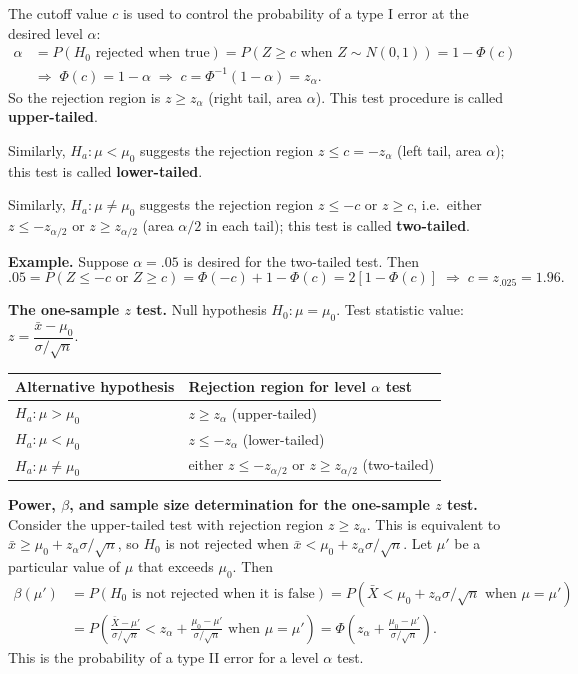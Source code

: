 The cutoff value $c$ is used to control the probability of a type I error at the desired level $\alpha$:
\begin{align*}
\alpha &= P(H_0 \text{ rejected when true}) = P(Z\ge c \text{ when } Z\sim N(0,1)) = 1-\Phi(c)\\
&\Rightarrow\; \Phi(c)=1-\alpha \;\Rightarrow\; c=\Phi^{-1}(1-\alpha)=z_\alpha .
\end{align*}
So the rejection region is $z\ge z_\alpha$ (right tail, area $\alpha$). This test procedure is called \textbf{upper-tailed}.


Similarly, $H_a:\mu<\mu_0$ suggests the rejection region $z\le c=-z_\alpha$ (left tail, area $\alpha$);
this test is called \textbf{lower-tailed}.


Similarly, $H_a:\mu\ne\mu_0$ suggests the rejection region $z\le -c$ or $z\ge c$, i.e.\
either $z\le -z_{\alpha/2}$ or $z\ge z_{\alpha/2}$ (area $\alpha/2$ in each tail);
this test is called \textbf{two-tailed}.


\textbf{Example.} Suppose $\alpha=.05$ is desired for the two-tailed test. Then
\[
.05 = P(Z\le -c \text{ or } Z\ge c) = \Phi(-c) + 1-\Phi(c) = 2[1-\Phi(c)]
\;\Rightarrow\; c = z_{.025} = 1.96 .
\]

\textbf{The one-sample $z$ test.}
Null hypothesis $H_0:\mu=\mu_0$. Test statistic value: $z = \dfrac{\bar{x}-\mu_0}{\sigma/\sqrt{n}}$.

\begin{center}
\begin{tabular}{ll}
\toprule
Alternative hypothesis & Rejection region for level $\alpha$ test\\
\midrule
$H_a:\mu>\mu_0$   & $z\ge z_\alpha$ (upper-tailed)\\
$H_a:\mu<\mu_0$   & $z\le -z_\alpha$ (lower-tailed)\\
$H_a:\mu\ne\mu_0$ & either $z\le -z_{\alpha/2}$ or $z\ge z_{\alpha/2}$ (two-tailed)\\
\bottomrule
\end{tabular}
\end{center}

\textbf{Power, $\beta$, and sample size determination for the one-sample $z$ test.}
Consider the upper-tailed test with rejection region $z\ge z_\alpha$. This is equivalent to
$\bar{x}\ge \mu_0 + z_\alpha\sigma/\sqrt{n}$, so $H_0$ is not rejected when
$\bar{x}<\mu_0+z_\alpha\sigma/\sqrt{n}$.
Let $\mu'$ be a particular value of $\mu$ that exceeds $\mu_0$. Then
\begin{align*}
\beta(\mu') &= P(H_0 \text{ is not rejected when it is false})
 = P\!\left(\bar{X}<\mu_0+z_\alpha\sigma/\sqrt{n} \text{ when } \mu=\mu'\right)\\
&= P\!\left(\frac{\bar{X}-\mu'}{\sigma/\sqrt{n}} < z_\alpha + \frac{\mu_0-\mu'}{\sigma/\sqrt{n}} \text{ when } \mu=\mu'\right)
 = \Phi\!\left(z_\alpha + \frac{\mu_0-\mu'}{\sigma/\sqrt{n}}\right).
\end{align*}
This is the probability of a type II error for a level $\alpha$ test.

